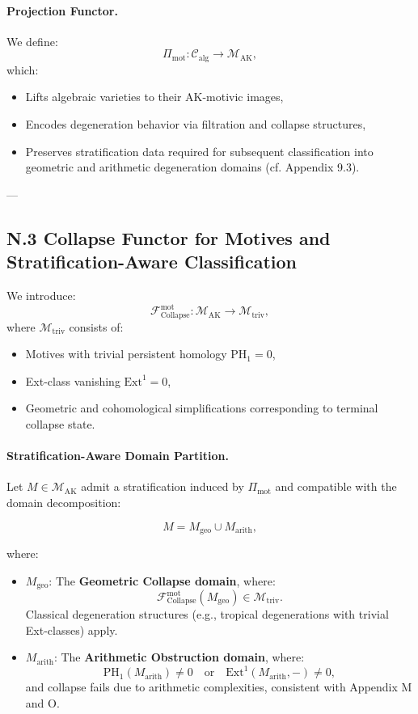 \documentclass[11pt]{article}
\begin{document}
\paragraph{Projection Functor.}
We define:
\[
\Pi_{\mathrm{mot}} : \mathcal{C}_{\mathrm{alg}} \longrightarrow \mathcal{M}_{\mathrm{AK}},
\]
which:
\begin{itemize}
  \item Lifts algebraic varieties to their AK-motivic images,
  \item Encodes degeneration behavior via filtration and collapse structures,
  \item Preserves stratification data required for subsequent classification into geometric and arithmetic degeneration domains (cf. Appendix 9.3).
\end{itemize}

---

\subsection*{N.3 Collapse Functor for Motives and Stratification-Aware Classification}

We introduce:
\[
\mathcal{F}_{\mathrm{Collapse}}^{\mathrm{mot}} : \mathcal{M}_{\mathrm{AK}} \longrightarrow \mathcal{M}_{\mathrm{triv}},
\]
where \( \mathcal{M}_{\mathrm{triv}} \) consists of:
\begin{itemize}
  \item Motives with trivial persistent homology \( \mathrm{PH}_1 = 0 \),
  \item Ext-class vanishing \( \mathrm{Ext}^1 = 0 \),
  \item Geometric and cohomological simplifications corresponding to terminal collapse state.
\end{itemize}

\paragraph{Stratification-Aware Domain Partition.}

Let \( M \in \mathcal{M}_{\mathrm{AK}} \) admit a stratification induced by \( \Pi_{\mathrm{mot}} \) and compatible with the domain decomposition:

\[
M = M_{\mathrm{geo}} \cup M_{\mathrm{arith}},
\]

where:

\begin{itemize}
    \item \( M_{\mathrm{geo}} \): The \textbf{Geometric Collapse domain}, where:
    \[
    \mathcal{F}_{\mathrm{Collapse}}^{\mathrm{mot}}(M_{\mathrm{geo}}) \in \mathcal{M}_{\mathrm{triv}}.
    \]
    Classical degeneration structures (e.g., tropical degenerations with trivial Ext-classes) apply.

    \item \( M_{\mathrm{arith}} \): The \textbf{Arithmetic Obstruction domain}, where:
    \[
    \mathrm{PH}_1(M_{\mathrm{arith}}) \neq 0 \quad \text{or} \quad \mathrm{Ext}^1(M_{\mathrm{arith}}, -) \neq 0,
    \]
    and collapse fails due to arithmetic complexities, consistent with Appendix M and O.
\end{itemize}
\end{document}
